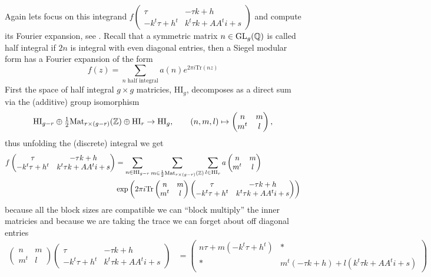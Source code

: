 Again lets focus on this integrand \(f\begin{pmatrix} \tau & -\tau k + h\\ -k^t \tau + h^t & k^t \tau k + A A^t i + s \end{pmatrix}\) and compute its Fourier expansion, see \cite[3.4]{bruinier123ModularForms2008}. Recall that a symmetric matrix \(n\in \GL_g(\Q)\) is called half integral if \(2n\) is integral with even diagonal entries, then a Siegel modular form has a Fourier expansion of the form
\[f(z) = \sum_{n \text{ half integral}}a(n) e^{2\pi i \mathrm{Tr}(nz)} \]
First the space of half integral \(g\times g\) matricies, \(\mathrm{HI}_g\), decomposes as a direct sum via the (additive) group isomorphism 
\[ \mathrm{HI}_{g-r} \oplus \tfrac{ 1}{ 2} \mathrm{Mat}_{ r\times (g-r)}(\Z) \oplus \mathrm{HI}_{r}\to\mathrm{HI}_g, \qquad (n, m, l)\mapsto \begin{pmatrix} n & m\\ m^t & l \end{pmatrix}, \]
thus unfolding the (discrete) integral we get 
\begin{align*}
    f\begin{pmatrix} \tau & -\tau k + h\\ -k^t \tau + h^t & k^t \tau k + A A^t i + s \end{pmatrix} &=   \sum_{n\in\mathrm{HI}_{g-r}} \sum_{m\in\frac{1}{2} \mathrm{Mat}_{ r\times (g-r)}(\Z)} \sum_{l\in\mathrm{HI}_{r}} a\begin{pmatrix} n & m\\ m^t & l \end{pmatrix} \\
    &\exp \left(2\pi i \mathrm{Tr} \begin{pmatrix} n & m\\ m^t & l \end{pmatrix}\begin{pmatrix} \tau & -\tau k + h\\ -k^t \tau + h^t & k^t \tau k + A A^t i + s \end{pmatrix} \right)  \\
\end{align*}
because all the block sizes are compatible we can ``block multiply'' the inner matricies and because we are taking the trace we can forget about off diagonal entries
\begin{align*}
    \begin{pmatrix} n & m\\ m^t & l \end{pmatrix}\begin{pmatrix} \tau & -\tau k + h\\ -k^t \tau + h^t & k^t \tau k + A A^t i + s \end{pmatrix} &= 
    \begin{pmatrix} n\tau + m(-k^t \tau + h^t ) & \ast\\ \ast & m^t(-\tau k + h) + l( k^t \tau k + A A^t i + s) \end{pmatrix}
\end{align*}
